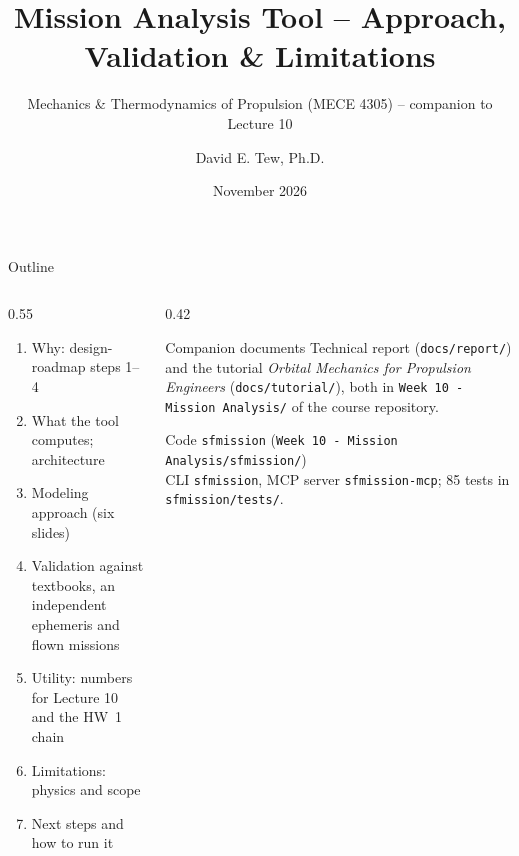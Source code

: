 \documentclass[aspectratio=169,10pt]{beamer}
\title[Mission Analysis Tool]{Mission Analysis Tool -- Approach, Validation \& Limitations}
\subtitle{Mechanics \& Thermodynamics of Propulsion (MECE 4305) -- companion to Lecture 10}
\author{David E. Tew, Ph.D.}
\institute[Columbia]{Columbia University \quad\textbullet\quad david.tew@columbia.edu}
\date{November 2026}
\newcommand{\code}[1]{\texttt{#1}}
\begin{document}
\begin{frame}
  \titlepage
\end{frame}

\begin{frame}{Outline}
  \begin{columns}[T]
    \begin{column}{0.55\textwidth}
      \begin{enumerate}
        \item Why: design-roadmap steps 1--4
        \item What the tool computes; architecture
        \item Modeling approach (six slides)
        \item Validation against textbooks, an independent ephemeris and flown missions
        \item Utility: numbers for Lecture 10 and the HW~1 chain
        \item Limitations: physics and scope
        \item Next steps and how to run it
      \end{enumerate}
    \end{column}
    \begin{column}{0.42\textwidth}
      \begin{block}{Companion documents}
        Technical report (\code{docs/report/}) and the tutorial \emph{Orbital Mechanics for Propulsion Engineers} (\code{docs/tutorial/}), both in \code{Week 10 - Mission Analysis/} of the course repository.
      \end{block}
      \begin{block}{Code}
        \code{sfmission} (\code{Week 10 - Mission Analysis/sfmission/})\\ CLI \code{sfmission}, MCP server \code{sfmission-mcp}; 85 tests in \code{sfmission/tests/}.
      \end{block}
    \end{column}
  \end{columns}
\end{frame}

\end{document}
